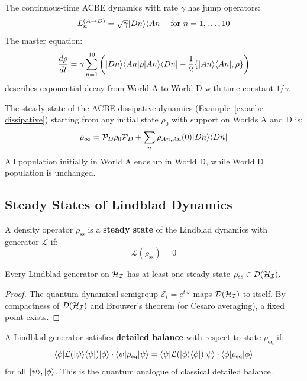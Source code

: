 \begin{example}
\label{ex:acbe-dissipative}
The continuous-time ACBE dynamics with rate $\gamma$ has jump operators:
\[
L_n^{(A \to D)} = \sqrt{\gamma} |Dn\rangle\langle An| \quad \text{for } n = 1, \ldots, 10
\]
The master equation:
\[
\frac{d\rho}{dt} = \gamma \sum_{n=1}^{10} \left( |Dn\rangle\langle An| \rho |An\rangle\langle Dn| - \frac{1}{2}\{|An\rangle\langle An|, \rho\} \right)
\]
describes exponential decay from World A to World D with time constant $1/\gamma$.
\end{example}

\begin{proposition}
\label{prop:acbe-steady}
The steady state of the ACBE dissipative dynamics (Example~\ref{ex:acbe-dissipative}) starting from any initial state $\rho_0$ with support on Worlds A and D is:
\[
\rho_{\infty} = \mathcal{P}_D \rho_0 \mathcal{P}_D + \sum_n \rho_{An,An}(0) |Dn\rangle\langle Dn|
\]
All population initially in World A ends up in World D, while World D population is unchanged.
\end{proposition}

\subsection{Steady States of Lindblad Dynamics}

\begin{definition}
\label{def:lindblad-steady}
A density operator $\rho_{\mathrm{ss}}$ is a \textbf{steady state} of the Lindblad dynamics with generator $\mathcal{L}$ if:
\[
\mathcal{L}(\rho_{\mathrm{ss}}) = 0
\]
\end{definition}

\begin{theorem}
\label{thm:lindblad-steady-existence}
Every Lindblad generator on $\mathcal{H}_{\mathcal{I}}$ has at least one steady state $\rho_{\mathrm{ss}} \in \mathcal{D}(\mathcal{H}_{\mathcal{I}})$.
\end{theorem}

\begin{proof}
The quantum dynamical semigroup $\mathcal{E}_t = e^{t\mathcal{L}}$ maps $\mathcal{D}(\mathcal{H}_{\mathcal{I}})$ to itself. By compactness of $\mathcal{D}(\mathcal{H}_{\mathcal{I}})$ and Brouwer's theorem (or Cesaro averaging), a fixed point exists.
\end{proof}

\begin{definition}
\label{def:detailed-balance}
A Lindblad generator satisfies \textbf{detailed balance} with respect to state $\rho_{\mathrm{eq}}$ if:
\[
\langle \phi|\mathcal{L}(|\psi\rangle\langle \psi|)|\phi\rangle \cdot \langle \psi|\rho_{\mathrm{eq}}|\psi\rangle = \langle \psi|\mathcal{L}(|\phi\rangle\langle \phi|)|\psi\rangle \cdot \langle \phi|\rho_{\mathrm{eq}}|\phi\rangle
\]
for all $|\psi\rangle, |\phi\rangle$. This is the quantum analogue of classical detailed balance.
\end{definition}

